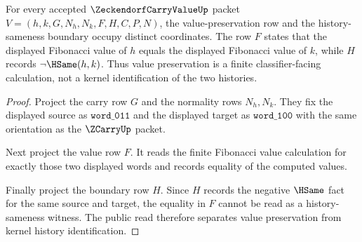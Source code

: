 \begin{theorem}
\label{thm:zeckendorf-carry-value-non-hsame-boundary}
For every accepted $\ZeckendorfCarryValueUp$ packet $V=(h,k,G,N_h,N_k,F,H,C,P,N)$, the value-preservation row and the history-sameness boundary occupy distinct coordinates. The row $F$ states that the displayed Fibonacci value of $h$ equals the displayed Fibonacci value of $k$, while $H$ records $\neg\HSame(h,k)$. Thus value preservation is a finite classifier-facing calculation, not a kernel identification of the two histories.
\end{theorem}
\begin{proof}
Project the carry row $G$ and the normality rows $N_h,N_k$. They fix the displayed source as $\mathtt{word\_011}$ and the displayed target as $\mathtt{word\_100}$ with the same orientation as the $\ZCarryUp$ packet.

Next project the value row $F$. It reads the finite Fibonacci value calculation for exactly those two displayed words and records equality of the computed values.

Finally project the boundary row $H$. Since $H$ records the negative $\HSame$ fact for the same source and target, the equality in $F$ cannot be read as a history-sameness witness. The public read therefore separates value preservation from kernel history identification.
\end{proof}

